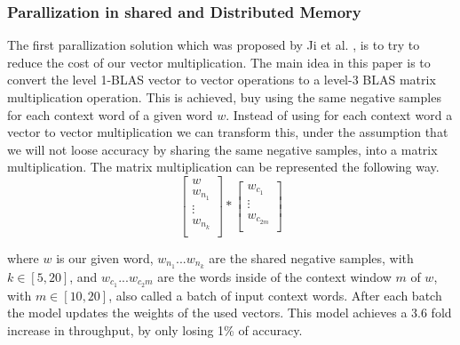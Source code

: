 \subsubsection{Parallization in shared and Distributed Memory}
The first parallization solution which was proposed by Ji et al. \cite{intel}, is to try to reduce the cost of our vector multiplication. The main idea in this paper is to convert the level 1-BLAS vector to vector operations to a level-3 BLAS matrix multiplication operation. This is achieved, buy using the same negative samples for each context word of a given word $w$. Instead of using for each context word a vector to vector multiplication we can transform this, under the assumption that we will not loose accuracy by sharing the same negative samples,  into a matrix multiplication. The matrix multiplication can be represented the following way.
\[
\begin{bmatrix}
w \\
w_{n_1}  \\
\vdots \\
w_{n_k}\\
\end{bmatrix}
*
\begin{bmatrix}
w_{c_1}\\
\vdots\\
w_{c_{2m}}\\
\end{bmatrix}
\]

where $w$ is our given word, $w_{n_1}...w_{n_k}$ are the shared negative samples, with $k \in [5,20]$, and $w_{c_1}...w_{c_2m}$ are the words inside of the context window $m$ of $w$, with $m \in [10,20]$, also called a batch of input context words. After each batch the model updates the weights of the used vectors. 
This model achieves a 3.6 fold increase in throughput, by only losing 1\% of accuracy. 
